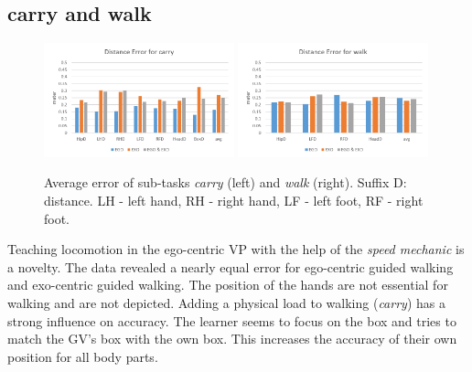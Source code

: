 \subsection{carry and walk}
\begin{figure}[htb]
	\centering
	\includegraphics[width=0.49\textwidth]{figures/distanceErrorCarry.png}
	\includegraphics[width=0.49\textwidth]{figures/distanceErrorWalk.png}
	\caption[Average error of sub-tasks \textit{carry} and \textit{walk}]{Average error of sub-tasks  \textit{carry} (left) and \textit{walk} (right). Suffix D: distance. LH - left hand, RH - right hand, LF - left foot, RF - right foot.}
	\label{fig:walkError}
\end{figure}
Teaching locomotion in the ego-centric VP with the help of the \textit{speed mechanic} is a novelty. The data revealed a nearly equal error for ego-centric guided walking and exo-centric guided walking. The position of the hands are not essential for walking and are not depicted. Adding a physical load to walking (\textit{carry}) has a strong influence on accuracy. The learner seems to focus on the box and tries to match the GV's box with the own box. This increases the accuracy of their own position for all body parts.

